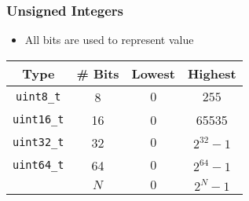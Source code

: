 \begin{frame}
  \frametitle{Unsigned Integers}
  \begin{itemize}
    \item All bits are used to represent value
  \end{itemize}
  \begin{center}
  \end{center}
  \begin{center}
    \begin{tabular}{cccc}
      \toprule
      \textbf{Type} & \textbf{\# Bits} & \textbf{Lowest} & \textbf{Highest} \\
      \midrule
      \texttt{uint8\_t} & 8 & $0$ & $255$ \\
      \texttt{uint16\_t} & 16 & \num{0} & \num{65535} \\
      \texttt{uint32\_t} & 32 & $0$ & $2^{32}-1$ \\
      \texttt{uint64\_t} & 64 & $0$ & $2^{64}-1$ \\
      & $N$ & $0$ & $2^{N}-1$ \\
      \bottomrule
    \end{tabular}
  \end{center}
\end{frame}
